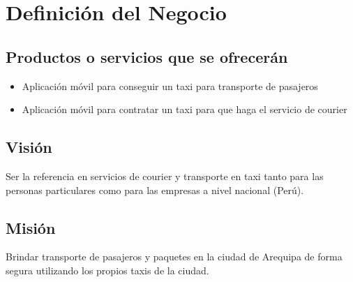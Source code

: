 \chapter{Definición del Negocio}

\section{Productos o servicios que se ofrecerán}

\begin{itemize}
\item Aplicación móvil para conseguir un taxi para transporte de pasajeros 
\item Aplicación móvil para contratar un taxi para que haga el servicio de courier
\end{itemize}

\section{Visión}

Ser la referencia en servicios de courier y transporte en taxi tanto para las personas particulares como para las empresas a nivel nacional (Perú).

\section{Misión}

Brindar transporte de pasajeros y paquetes en la ciudad de Arequipa de forma segura utilizando los propios taxis de la ciudad.